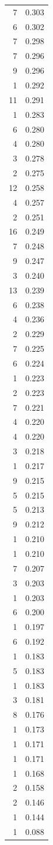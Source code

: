 \begin{tabular}{rr}
7 & 0.303 \\
6 & 0.302 \\
7 & 0.298 \\
7 & 0.296 \\
9 & 0.296 \\
1 & 0.292 \\
11 & 0.291 \\
1 & 0.283 \\
6 & 0.280 \\
4 & 0.280 \\
3 & 0.278 \\
2 & 0.275 \\
12 & 0.258 \\
4 & 0.257 \\
2 & 0.251 \\
16 & 0.249 \\
7 & 0.248 \\
9 & 0.247 \\
3 & 0.240 \\
13 & 0.239 \\
6 & 0.238 \\
4 & 0.236 \\
2 & 0.229 \\
7 & 0.225 \\
6 & 0.224 \\
1 & 0.223 \\
2 & 0.223 \\
7 & 0.221 \\
4 & 0.220 \\
4 & 0.220 \\
3 & 0.218 \\
1 & 0.217 \\
9 & 0.215 \\
5 & 0.215 \\
5 & 0.213 \\
9 & 0.212 \\
1 & 0.210 \\
1 & 0.210 \\
7 & 0.207 \\
3 & 0.203 \\
1 & 0.203 \\
6 & 0.200 \\
1 & 0.197 \\
6 & 0.192 \\
1 & 0.183 \\
5 & 0.183 \\
1 & 0.183 \\
3 & 0.181 \\
8 & 0.176 \\
1 & 0.173 \\
1 & 0.171 \\
1 & 0.171 \\
1 & 0.168 \\
2 & 0.158 \\
2 & 0.146 \\
1 & 0.144 \\
1 & 0.088 \\
\bottomrule
\end{tabular}
